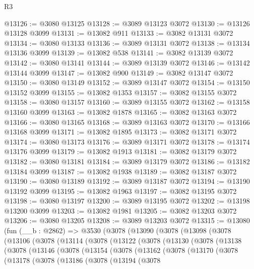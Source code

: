 \begin{lexlean}{R3}
\begin{coremodule}
@13126 := @3080 @13125
@13128 := @3089 @13123 @3072
@13130 := @13126 @13128 @3099
@13131 := @13082 @911
@13133 := @3082 @13131 @3072
@13134 := @3080 @13133
@13136 := @3089 @13131 @3072
@13138 := @13134 @13136 @3099
@13139 := @13082 @538
@13141 := @3082 @13139 @3072
@13142 := @3080 @13141
@13144 := @3089 @13139 @3072
@13146 := @13142 @13144 @3099
@13147 := @13082 @900
@13149 := @3082 @13147 @3072
@13150 := @3080 @13149
@13152 := @3089 @13147 @3072
@13154 := @13150 @13152 @3099
@13155 := @13082 @1353
@13157 := @3082 @13155 @3072
@13158 := @3080 @13157
@13160 := @3089 @13155 @3072
@13162 := @13158 @13160 @3099
@13163 := @13082 @1878
@13165 := @3082 @13163 @3072
@13166 := @3080 @13165
@13168 := @3089 @13163 @3072
@13170 := @13166 @13168 @3099
@13171 := @13082 @1895
@13173 := @3082 @13171 @3072
@13174 := @3080 @13173
@13176 := @3089 @13171 @3072
@13178 := @13174 @13176 @3099
@13179 := @13082 @1913
@13181 := @3082 @13179 @3072
@13182 := @3080 @13181
@13184 := @3089 @13179 @3072
@13186 := @13182 @13184 @3099
@13187 := @13082 @1938
@13189 := @3082 @13187 @3072
@13190 := @3080 @13189
@13192 := @3089 @13187 @3072
@13194 := @13190 @13192 @3099
@13195 := @13082 @1963
@13197 := @3082 @13195 @3072
@13198 := @3080 @13197
@13200 := @3089 @13195 @3072
@13202 := @13198 @13200 @3099
@13203 := @13082 @1981
@13205 := @3082 @13203 @3072
@13206 := @3080 @13205
@13208 := @3089 @13203 @3072
@13315 := @13080
    (fun (__b : @2862) =>
    @3530
      (@3078
        (@13090
          (@3078
            (@13098
              (@3078
                (@13106
                  (@3078
                    (@13114
                      (@3078
                        (@13122
                          (@3078
                            (@13130
                              (@3078
                                (@13138
                                  (@3078
                                    (@13146
                                      (@3078
                                        (@13154
                                          (@3078
                                            (@13162
                                              (@3078
                                                (@13170
                                                  (@3078
                                                    (@13178
                                                      (@3078
                                                        (@13186
                                                          (@3078
                                                            (@13194
                                                              (@3078

\end{coremodule}
\end{lexlean}
